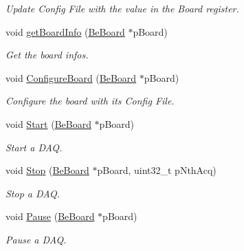 \begin{CompactItemize}
\begin{CompactList}\small\item\em Update Config File with the value in the Board register. \item\end{CompactList}\item 
void \hyperlink{class_ph2___hw_interface_1_1_be_board_interface_e423a6ec7526a0abd9ce3c9e0e3b1847}{get\-Board\-Info} (\hyperlink{class_ph2___hw_description_1_1_be_board}{Be\-Board} $\ast$p\-Board)
\begin{CompactList}\small\item\em Get the board infos. \item\end{CompactList}\item 
void \hyperlink{class_ph2___hw_interface_1_1_be_board_interface_808eabcbd850dd651f9b3122f702079f}{Configure\-Board} (\hyperlink{class_ph2___hw_description_1_1_be_board}{Be\-Board} $\ast$p\-Board)
\begin{CompactList}\small\item\em Configure the board with its Config File. \item\end{CompactList}\item 
void \hyperlink{class_ph2___hw_interface_1_1_be_board_interface_c78a16fd4779f86c1224b09d30349e18}{Start} (\hyperlink{class_ph2___hw_description_1_1_be_board}{Be\-Board} $\ast$p\-Board)
\begin{CompactList}\small\item\em Start a DAQ. \item\end{CompactList}\item 
void \hyperlink{class_ph2___hw_interface_1_1_be_board_interface_08d0374efe31d8078f8d31f58b709e6f}{Stop} (\hyperlink{class_ph2___hw_description_1_1_be_board}{Be\-Board} $\ast$p\-Board, uint32\_\-t p\-Nth\-Acq)
\begin{CompactList}\small\item\em Stop a DAQ. \item\end{CompactList}\item 
void \hyperlink{class_ph2___hw_interface_1_1_be_board_interface_2b9692f018d7756fbfd720224da542da}{Pause} (\hyperlink{class_ph2___hw_description_1_1_be_board}{Be\-Board} $\ast$p\-Board)
\begin{CompactList}\small\item\em Pause a DAQ. \item\end{CompactList}\item 

\end{CompactItemize}
